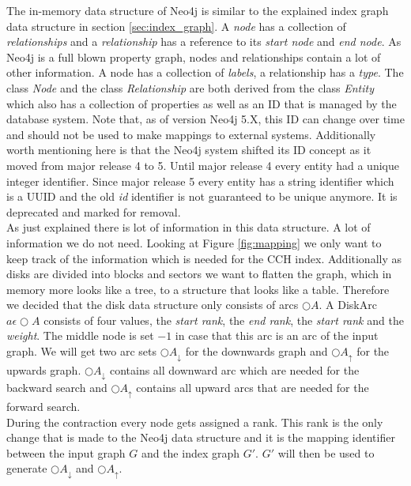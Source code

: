 The in-memory data structure of Neo4j is similar to the explained index graph data structure in section \ref{sec:index_graph}.
A \textit{node} has a collection of \textit{relationships} and a \textit{relationship} has a reference to its \textit{start node} and \textit{end node}.
As Neo4j is a full blown property graph, nodes and relationships contain a lot of other information.
A node has a collection of \textit{labels}, a relationship has a \textit{type}.
The class \textit{Node} and the class \textit{Relationship} 
are both derived from the class \textit{Entity} which also has a collection of properties as well as an ID that is managed by the database system.
Note that, as of version Neo4j 5.X, this ID can change over time and should not be used to make mappings to external systems.
Additionally worth mentioning here is that the Neo4j system shifted its ID concept as it moved from major release 4 to 5.
Until major release 4 every entity had a unique integer identifier.
Since major release 5 every entity has a string identifier which is a UUID and the old \textit{id} identifier is not guaranteed to be unique anymore.
It is deprecated and marked for removal.
\\
As just explained there is lot of information in this data structure.
A lot of information we do not need.
Looking at Figure \ref{fig:mapping} we only want to keep track of the information which is needed for the CCH index.
Additionally as disks are divided  into blocks and sectors we want to flatten the graph, which in memory more looks like a tree, to a structure that looks like a table.
Therefore we decided that the disk data structure only consists of arcs $\bigcirc A$.
A DiskArc $a \epsilon \bigcirc A$ consists of four values, 
the \textit{start rank}, the \textit{end rank}, the \textit{start rank} and the \textit{weight}.
The middle node is set $-1$ in case that this arc is an arc of the input graph.
We will get two arc sets $\bigcirc A_\downarrow$ for the downwards graph and $\bigcirc A_\uparrow $ for the upwards graph.
$\bigcirc A_\downarrow$ contains all downward arc which are needed for the backward search and $\bigcirc A_\uparrow$ contains all upward arcs that are needed for the forward search.
\\
During the contraction every node gets assigned a rank.
This rank is the only change that is made to the Neo4j data structure and it is the mapping identifier between the input graph $G$ and the index graph $G'$.
$G'$ will then be used to generate $\bigcirc A_\downarrow$ and $\bigcirc A_\uparrow$.



